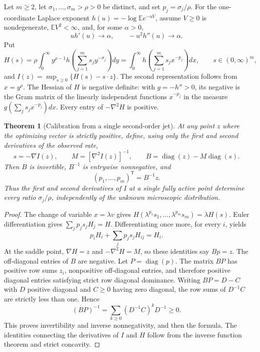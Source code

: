 \documentclass[11pt,letterpaper]{article}
\newtheorem{theorem}{Theorem}[section]
\theoremstyle{definition}
\theoremstyle{remark}
\newcommand{\1}{\mathbf 1}
\begin{document}
Let $m\ge2$, let $\sigma_1,\ldots,\sigma_m>\rho>0$ be distinct,
and set $p_j=\sigma_j/\rho$.  For the one-coordinate Laplace exponent
$h(u)=-\log\mathbb E e^{-uV}$, assume $V\ge0$ is nondegenerate,
$\mathbb EV^2<\infty$, and, for some $\alpha>0$,
\[
 uh'(u)\longrightarrow\alpha,
 \qquad -u^2h''(u)\longrightarrow\alpha.
\]
Put
\[
 H(s)=\rho\int_0^\infty y^{\rho-1}
 h\left(\sum_{j=1}^m s_jy^{-\sigma_j}\right)dy
 =\int_0^\infty h\left(\sum_{j=1}^m s_jx^{-p_j}\right)dx,
 \qquad s\in(0,\infty)^m,
\]
and $I(z)=\sup_{s\ge0}\{H(s)-s\cdot z\}$.
The second representation follows from $x=y^\rho$.
The Hessian of $H$ is negative definite: with $g=-h''>0$,
its negative is the Gram matrix of the linearly independent functions
$x^{-p_j}$ in the measure
$g(\sum_j s_jx^{-p_j})dx$.
Every entry of $-\nabla^2H$ is positive.

\begin{theorem}[Calibration from a single second-order jet]
\label{p06:thm:blind-jet-calibration}
At any point $z$ where the optimizing vector is strictly positive,
define, using only the first and second derivatives of the observed rate,
\[
 s=-\nabla I(z),\qquad
 M=[\nabla^2I(z)]^{-1},\qquad
 B=\operatorname{diag}(z)-M\operatorname{diag}(s).
\]
Then $B$ is invertible, $B^{-1}$ is entrywise nonnegative, and
\begin{equation}\label{p06:eq:blind-calibration-formula}
 (p_1,\ldots,p_m)^{\mathsf T}=B^{-1}z.
\end{equation}
Thus the first and second derivatives of $I$ at a single fully active
point determine every ratio $\sigma_j/\rho$, independently of the
unknown microscopic distribution.
\end{theorem}

\begin{proof}
The change of variable $x=\lambda v$ gives
$H(\lambda^{p_1}s_1,\ldots,\lambda^{p_m}s_m)=\lambda H(s)$.
Euler differentiation gives $\sum_jp_js_jH_j=H$.  Differentiating
once more, for every $i$, yields
\[
 p_iH_i+\sum_jp_js_jH_{ij}=H_i.
\]
At the saddle point, $\nabla H=z$ and $-\nabla^2H=M$, so these
identities say $Bp=z$.  The off-diagonal entries of $B$ are negative.
Let $P=\operatorname{diag}(p)$.  The matrix $BP$ has positive row
sums $z_i$, nonpositive off-diagonal entries, and therefore positive
diagonal entries satisfying strict row diagonal dominance.  Writing
$BP=D-C$ with $D$ positive diagonal and $C\ge0$ having zero diagonal,
the row sums of $D^{-1}C$ are strictly less than one.  Hence
\[
 (BP)^{-1}=\sum_{k\ge0}(D^{-1}C)^kD^{-1}\ge0.
\]
This proves invertibility and inverse nonnegativity, and then the
formula.  The identities connecting the derivatives of $I$ and $H$
follow from the inverse function theorem and strict concavity.
\end{proof}
\end{document}
